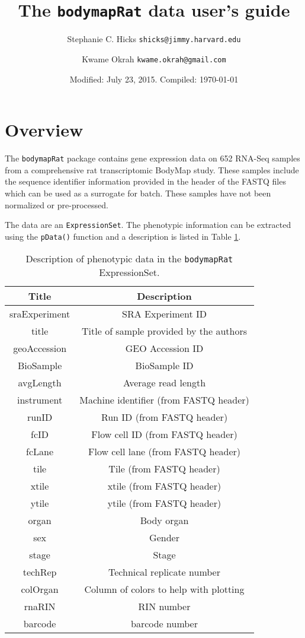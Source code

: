 \documentclass{article}\usepackage[]{graphicx}\usepackage[usenames,dvipsnames]{color}
\title{The \texttt{bodymapRat} data user's guide}
\author{Stephanie C. Hicks \texttt{shicks@jimmy.harvard.edu} \and
Kwame Okrah \texttt{kwame.okrah@gmail.com} }
\date{Modified: July 23, 2015.  Compiled: \today}
\begin{document}
\maketitle



\section{Overview}


The \texttt{bodymapRat} package contains gene expression data on 652 RNA-Seq samples from a
comprehensive rat transcriptomic BodyMap study. These samples include the sequence
identifier information provided in the header of the FASTQ files which can be used
as a surrogate for batch. These samples have not been normalized or pre-processed.

The data are an \texttt{ExpressionSet}. The phenotypic information can be extracted
using the \texttt{pData()} function and a description is listed in Table
\ref{tab:description}.

\begin{table}[h]
\caption{Description of phenotypic data in the \texttt{bodymapRat} ExpressionSet. }
\begin{center}
\begin{tabular}{|c|c|}
\hline
Title & Description \\
\hline
sraExperiment & SRA Experiment ID\\
title & Title of sample provided by the authors \\
geoAccession & GEO Accession ID\\
BioSample & BioSample ID\\
avgLength & Average read length \\
instrument & Machine identifier (from FASTQ header) \\
runID & Run ID (from FASTQ header) \\
fcID & Flow cell ID (from FASTQ header) \\
fcLane & Flow cell lane (from FASTQ header) \\
tile & Tile (from FASTQ header)\\
xtile & xtile (from FASTQ header) \\
ytile & ytile (from FASTQ header)\\
organ & Body organ \\
sex & Gender \\
stage & Stage \\
techRep & Technical replicate number \\
colOrgan & Column of colors to help with plotting \\
rnaRIN & RIN number \\
barcode & barcode number\\
\hline
\end{tabular}
\end{center}
\label{tab:description}
\end{table}%
\end{document}
